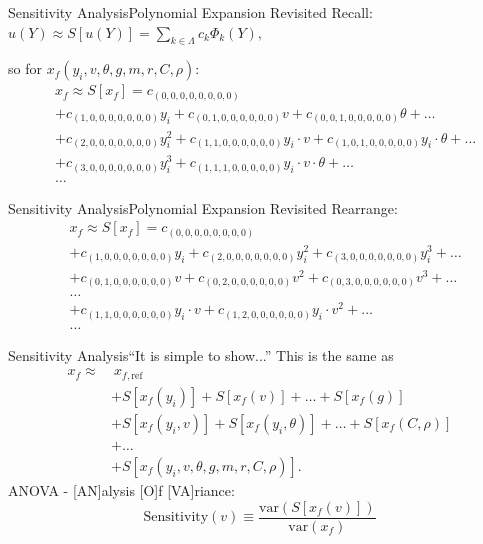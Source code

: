 \documentclass{beamer}
\begin{document}
\begin{frame}{Sensitivity Analysis}{Polynomial Expansion Revisited}\vspace{-30pt}
Recall: $u(Y)\approx S[u(Y)]=\sum_{k\in\Lambda}c_k\Phi_k(Y),$ 

so for $x_f(y_i,v,\theta,g,m,r,C,\rho)$:
\begin{align*}
&x_f \approx S[x_f]= c_{(0,0,0,0,0,0,0,0)} \\
 &+c_{(1,0,0,0,0,0,0,0)}y_i + c_{(0,1,0,0,0,0,0,0)}v + c_{(0,0,1,0,0,0,0,0)}\theta+\ldots\\
 &+c_{(2,0,0,0,0,0,0,0)}y_i^2 + c_{(1,1,0,0,0,0,0,0)}y_i\cdot v + c_{(1,0,1,0,0,0,0,0)}y_i\cdot \theta +\ldots\\
 &+c_{(3,0,0,0,0,0,0,0)}y_i^3 + c_{(1,1,1,0,0,0,0,0)}y_i\cdot v\cdot\theta +\ldots\\
 &\ldots
\end{align*}
\end{frame}

\begin{frame}{Sensitivity Analysis}{Polynomial Expansion Revisited}\vspace{-30pt}
Rearrange:
\begin{align*}
&x_f \approx S[x_f]=c_{(0,0,0,0,0,0,0,0)} \\
 &+c_{(1,0,0,0,0,0,0,0)}y_i + c_{(2,0,0,0,0,0,0,0)}y_i^2 + c_{(3,0,0,0,0,0,0,0)}y_i^3+\ldots\\
 &+c_{(0,1,0,0,0,0,0,0)}v + c_{(0,2,0,0,0,0,0,0)}v^2 + c_{(0,3,0,0,0,0,0,0)}v^3+\ldots\\
 &\ldots\\
 &+c_{(1,1,0,0,0,0,0,0)}y_i\cdot v + c_{(1,2,0,0,0,0,0,0)}y_i\cdot v^2+\ldots\\
 &\ldots
\end{align*}
\end{frame}

\begin{frame}{Sensitivity Analysis}{``It is simple to show...''}\vspace{-20pt}
This is the same as \vspace{-10pt}
\begin{align*}
x_f \approx &\ x_{f,\text{ref}} \\
 &+S[x_f(y_i)]+S[x_f(v)]+\ldots+S[x_f(g)]\\
 &+S[x_f(y_i,v)] + S[x_f(y_i,\theta)]+\ldots+S[x_f(C,\rho)]\\
 &+\ldots\\
 &+S[x_f(y_i,v,\theta,g,m,r,C,\rho)].
\end{align*}
ANOVA - [AN]alysis [O]f [VA]riance:
\begin{equation*}
\text{Sensitivity}(v) \equiv \frac{\text{var}(S[x_f(v)])}{\text{var}(x_f)}
\end{equation*}
\end{frame}
\end{document}
